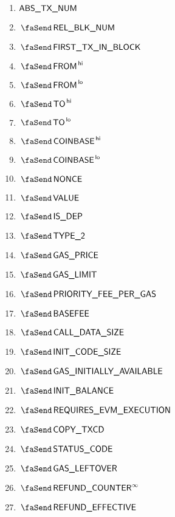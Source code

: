 \begin{description}
		\begin{multicols}{3}
			\begin{enumerate}
				\item $\textsf{ABS\_TX\_NUM}$
				\item $\txBlockNum$
				\item $\txFirstTransactionInBlock$
				\item $\txFrom\high$
				\item $\txFrom\low$
				\item $\txTo\high$
				\item $\txTo\low$
				\item $\txCoinbase\high$
				\item $\txCoinbase\low$
				\item $\txNonce$
				\item $\txValue$
				\item $\txIsDeployment$
				\item $\txIsTypeTwo$
				\item $\txGasPrice$
				\item $\txGasLimit$
				\item $\txPriorityFeePerGas$
				\item $\txBasefee$
				\item $\txCallDataSize$
				\item $\txInitCodeSize$
				\item $\txInitialGas$
				\item $\txInitialBalance$
				\item $\txRequiresEvmExecution$
				\item $\txCopyTxcd$ 
				\item $\txStatusCode$
				\item $\txLeftoverGas$
				\item $\txFinalRefundCounter$
				\item $\txEffectiveRefund$
			\end{enumerate}
		\end{multicols}
\end{description}
